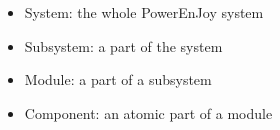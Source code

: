 \begin{itemize}
\item System: the whole PowerEnJoy system
\item Subsystem: a part of the system
\item Module: a part of a subsystem
\item Component: an atomic part of a module
\end{itemize}